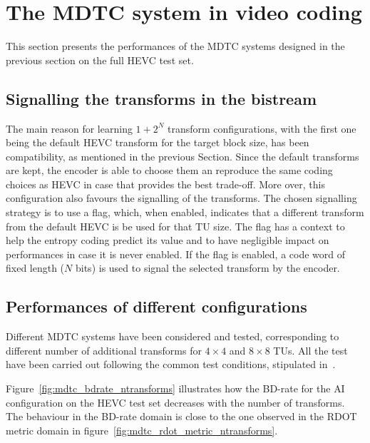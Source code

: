 \documentclass[11pt,a4paper,openright,twoside]{book}
\numberwithin{equation}{section} %
\numberwithin{figure}{section} %
\numberwithin{table}{section} %
\begin{document}
\section{The \acs{MDTC} system in video coding}
\label{sec:performances_of_the_mdtc_system}

This section presents the performances of the \ac{MDTC} systems designed in
the previous section on the full \ac{HEVC} test set.

\subsection{Signalling the transforms in the bistream}
\label{sub:mdtc_signalling}

The main reason for learning $1+2^N$ transform configurations, with the first
one being the default \ac{HEVC} transform for the target block size, has been
compatibility, as mentioned in the previous Section.
Since the default transforms are kept, the encoder is able to choose them an
reproduce the same coding choices as \ac{HEVC} in case that provides the best
trade-off.
More over, this configuration also favours the signalling of the transforms.
The chosen signalling strategy is to use a flag, which, when enabled,
indicates that a different transform from the default \ac{HEVC} is be used for
that \ac{TU} size.
The flag has a context to help the entropy coding predict its value and to
have negligible impact on performances in case it is never enabled.
If the flag is enabled, a code word of fixed length ($N$ bits) is used to
signal the selected transform by the encoder.

\subsection{Performances of different configurations}
\label{sub:mdtc_performances}

Different \ac{MDTC} systems have been considered and tested, corresponding to
different number of additional transforms for $4\times4$ and $8\times8$
\acp{TU}.
All the test have been carried out following the common test conditions,
stipulated in~\cite{bossen-12-common-test-conditions}.

Figure~\ref{fig:mdtc_bdrate_ntransforms} illustrates how the \ac{BD}-rate for
the \ac{AI} configuration on the \ac{HEVC} test set decreases with the number
of transforms.
The behaviour in the \ac{BD}-rate domain is close to the one observed in the
\ac{RDOT} metric domain in figure~\ref{fig:mdtc_rdot_metric_ntransforms}.
\end{document}
